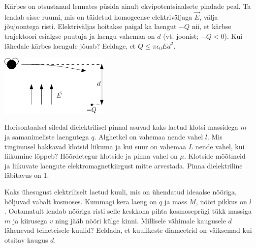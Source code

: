 \documentclass[10pt, twoside]{article}
\begin{document}
{
Kärbes on otsustanud
lennates püsida ainult ekvipotentsiaalsete pindade peal. Ta lendab sisse ruumi,
mis on täidetud homogeense elektriväljaga $\vec{E}$, välja jõujoontega risti.
Elektriväljas hoitakse paigal ka laengut $-Q$ nii, et kärbse
trajektoori esialgse puutuja ja laengu vahemaa on $d$ (vt. joonist; $-Q < 0$).
Kui lähedale kärbes laengule jõuab? Eeldage, et $Q \le \pi\epsilon_0Ed^2$.
\begin{center}
	\includegraphics[width=0.4\textwidth]{2010-lahg-07-muha_tekst}
\end{center}
\probend
\bigskip


Horisontaalsel siledal dielektrilisel pinnal asuvad kaks laetud klotsi massidega $m$ ja samanimeliste laengutega $q$. Alghetkel on vahemaa nende vahel $l$. Mis tingimusel hakkavad klotsid liikuma ja kui suur on vahemaa $L$ nende vahel, kui liikumine lõppeb? Hõõrdetegur klotside ja pinna vahel on $\mu$. Klotside mõõtmeid ja liikuvate laengute elektromagnetkiirgust mitte arvestada. Pinna dielektriline läbitavus on 1.
\probend
\bigskip


Kaks ühesugust elektriliselt laetud
kuuli, mis on ühendatud ideaalse nööriga, hõljuvad vabalt kosmoses. Kummagi
kera laeng on $q$ ja mass $M$, nööri pikkus on $l$.
Ootamatult lendab nööriga risti selle keskkoha pihta kosmoseprügi tükk massiga $m$ ja kiirusega
$v$ ning jääb nööri külge kinni. Millisele vähimale kaugusele $d$ lähenevad teineteisele kuulid?
Eeldada, et kuulikeste diameetrid on väiksemad kui otsitav kaugus $d$.
\probend
\bigskip
\newpage\subsection{\protect{}}


}
\end{document}
